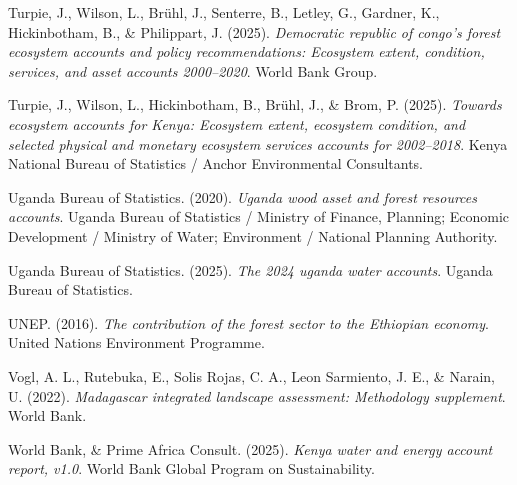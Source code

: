 \documentclass[
  letterpaper,
  DIV=11,
  numbers=noendperiod]{scrartcl}
\newlength{\cslhangindent}
\newenvironment{CSLReferences}[2] %
 {\begin{list}{}{%
  \setlength{\itemindent}{0pt}
  \setlength{\leftmargin}{0pt}
  \setlength{\parsep}{0pt}
  \ifodd #1
   \setlength{\leftmargin}{\cslhangindent}
   \setlength{\itemindent}{-1\cslhangindent}
  \fi
  \setlength{\itemsep}{#2\baselineskip}}}
 {\end{list}}
\begin{document}
\begin{CSLReferences}{1}{0}
Turpie, J., Wilson, L., Brühl, J., Senterre, B., Letley, G., Gardner,
K., Hickinbotham, B., \& Philippart, J. (2025). \emph{Democratic
republic of congo's forest ecosystem accounts and policy
recommendations: Ecosystem extent, condition, services, and asset
accounts 2000--2020}. World Bank Group.

Turpie, J., Wilson, L., Hickinbotham, B., Brühl, J., \& Brom, P. (2025).
\emph{Towards ecosystem accounts for {Kenya}: Ecosystem extent,
ecosystem condition, and selected physical and monetary ecosystem
services accounts for 2002--2018}. Kenya National Bureau of Statistics /
Anchor Environmental Consultants.

Uganda Bureau of Statistics. (2020). \emph{Uganda wood asset and forest
resources accounts}. Uganda Bureau of Statistics / Ministry of Finance,
Planning; Economic Development / Ministry of Water; Environment /
National Planning Authority.

Uganda Bureau of Statistics. (2025). \emph{The 2024 uganda water
accounts}. Uganda Bureau of Statistics.

UNEP. (2016). \emph{The contribution of the forest sector to the
{Ethiopian} economy}. United Nations Environment Programme.

Vogl, A. L., Rutebuka, E., Solis Rojas, C. A., Leon Sarmiento, J. E., \&
Narain, U. (2022). \emph{Madagascar integrated landscape assessment:
Methodology supplement}. World Bank.

World Bank, \& Prime Africa Consult. (2025). \emph{Kenya water and
energy account report, v1.0}. World Bank Global Program on
Sustainability.

\end{CSLReferences}
\end{document}
